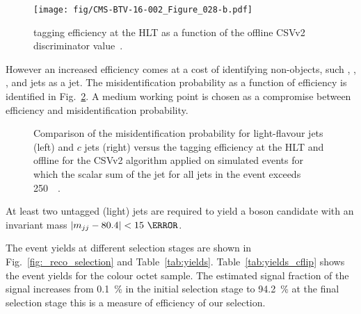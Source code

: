 \begin{figure}[hbtp]
\centering
\texttt{[image: fig/CMS-BTV-16-002\_Figure\_028-b.pdf]}
\caption{\cPqb tagging efficiency at the HLT as a function of the offline CSVv2 discriminator value~\cite{Sirunyan:2017ezt}.}
\label{fig:CMS-BTV-16-002_Figure_028-b}
\end{figure}

However an increased efficiency comes at a cost of identifying non-\cPqb objects, such \cPqc, \cPqs, \cPqu, \cPqd and \Pg jets as a \cPqb jet. The misidentification probability as a function of efficiency is identified in Fig.~\ref{fig:CMS-BTV-16-002_Figure_029}. A medium working point is chosen as a compromise between efficiency and misidentification probability.

\begin{figure}[hbtp]
\centering
  \def\twidth{0.45}
  \centering
  \hfil
\caption{Comparison of the misidentification probability for light-flavour jets (left) and $c$ jets (right) versus the \cPqb tagging efficiency at the HLT and offline for the CSVv2 algorithm applied on simulated \ttbar events for which the scalar sum of the jet \pt for all jets in the event exceeds 250~\GeV~\cite{Sirunyan:2017ezt}.}
\label{fig:CMS-BTV-16-002_Figure_029}
\end{figure}

At least two untagged (light) jets are required to yield a \PW boson candidate with an invariant mass $\left|m_{jj}-80.4\right|<15~\GeV$.

The event yields at different selection stages are shown in Fig.~\ref{fig:_reco_selection} and Table~\ref{tab:yields}. Table~\ref{tab:yields_cflip} shows the event yields for the colour octet \PW sample. The estimated signal fraction of the signal increases from 0.1~\% in the initial selection stage to 94.2~\% at the final selection stage \textendash this is a measure of efficiency of our selection.


